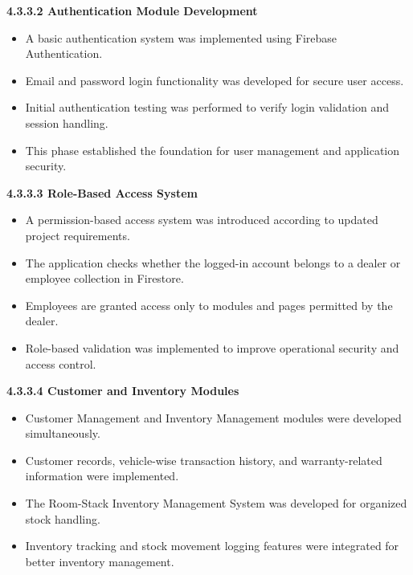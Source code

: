 \documentclass[12pt, oneside]{article}
\begin{document}
\textbf{4.3.3.2 Authentication Module Development}

\begin{itemize}
    \item A basic authentication system was implemented using Firebase Authentication.
    
    \item Email and password login functionality was developed for secure user access.
    
    \item Initial authentication testing was performed to verify login validation and session handling.
    
    \item This phase established the foundation for user management and application security.
\end{itemize}

\textbf{4.3.3.3 Role-Based Access System}

\begin{itemize}
    \item A permission-based access system was introduced according to updated project requirements.
    
    \item The application checks whether the logged-in account belongs to a dealer or employee collection in Firestore.
    
    \item Employees are granted access only to modules and pages permitted by the dealer.
    
    \item Role-based validation was implemented to improve operational security and access control.
\end{itemize}

\textbf{4.3.3.4 Customer and Inventory Modules}

\begin{itemize}
    \item Customer Management and Inventory Management modules were developed simultaneously.
    
    \item Customer records, vehicle-wise transaction history, and warranty-related information were implemented.
    
    \item The Room-Stack Inventory Management System was developed for organized stock handling.
    
    \item Inventory tracking and stock movement logging features were integrated for better inventory management.
\end{itemize}
\end{document}
